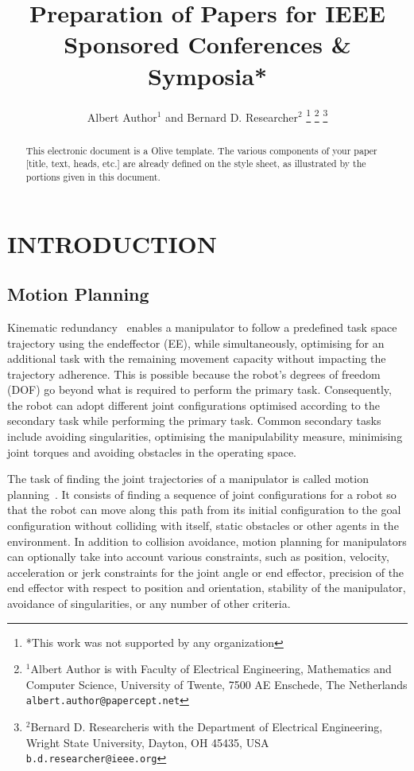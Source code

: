 \documentclass[letterpaper, 10 pt, conference]{ieeeconf}  %
\title{\LARGE \bf
Preparation of Papers for IEEE Sponsored Conferences \& Symposia*
}
\author{Albert Author$^{1}$ and Bernard D. Researcher$^{2}$%
\thanks{*This work was not supported by any organization}%
\thanks{$^{1}$Albert Author is with Faculty of Electrical Engineering, Mathematics and Computer Science,
        University of Twente, 7500 AE Enschede, The Netherlands
        {\tt\small albert.author@papercept.net}}%
\thanks{$^{2}$Bernard D. Researcheris with the Department of Electrical Engineering, Wright State University,
        Dayton, OH 45435, USA
        {\tt\small b.d.researcher@ieee.org}}%
}
\begin{document}
\maketitle
\thispagestyle{empty}
\pagestyle{empty}


\begin{abstract}

This electronic document is a Olive template. The various components of your paper [title, text, heads, etc.] are already defined on the style sheet, as illustrated by the portions given in this document.

\end{abstract}


\section{INTRODUCTION}

\subsection{Motion Planning}


Kinematic redundancy~\cite{siciliano1990kinematic, siciliano2016springer} enables a manipulator to follow a predefined task space trajectory using the endeffector (EE), while simultaneously, optimising for an additional task with the remaining movement capacity without impacting the trajectory adherence. This is possible because the robot's degrees of freedom (DOF) go beyond what is required to perform the primary task. Consequently, the robot can adopt different joint configurations optimised according to the secondary task while performing the primary task. Common secondary tasks~\cite{siciliano2010robot} include avoiding singularities, optimising the manipulability measure, minimising joint torques and avoiding obstacles in the operating space.

The task of finding the joint trajectories of a manipulator is called motion planning~\cite{IDEASLab2023}. It consists of finding a sequence of joint configurations for a robot so that the robot can move along this path from its initial configuration to the goal configuration without colliding with itself, static obstacles or other agents in the environment. In addition to collision avoidance, motion planning for manipulators can optionally take into account various constraints, such as position, velocity, acceleration or jerk constraints for the joint angle or end effector, precision of the end effector with respect to position and orientation, stability of the manipulator, avoidance of singularities, or any number of other criteria.
\end{document}

